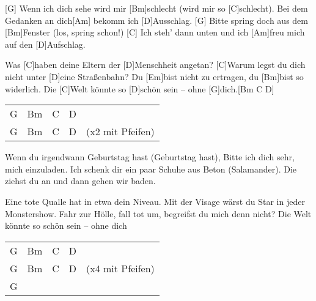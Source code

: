 

\begin{guitar}
	[G] Wenn ich dich sehe wird mir [Bm]schlecht (wird mir so [C]schlecht).
	Bei dem Gedanken an dich[Am] bekomm ich [D]Ausschlag.
	[G] Bitte spring doch aus dem [Bm]Fenster (los, spring schon!)
	[C] Ich steh' dann unten und ich [Am]freu mich auf den [D]Aufschlag.
	
	Was [C]haben deine Eltern der [D]Menschheit angetan?
	[C]Warum legst du dich nicht unter [D]eine Straßenbahn?
	Du [Em]bist nicht zu ertragen, du [Bm]bist so widerlich.
	Die [C]Welt könnte so [D]schön sein – ohne [G]dich.[Bm C D]{}
	
	{\footnotesize\begin{tabular}{l|l|l|l l}
			G & Bm & C & D & \\
			G & Bm & C & D & (x2 mit Pfeifen)
	\end{tabular}}

	Wenn du irgendwann Geburtstag hast (Geburtstag hast),
	Bitte ich dich sehr, mich einzuladen.
	Ich schenk dir ein paar Schuhe aus Beton (Salamander).
	Die ziehst du an und dann gehen wir baden.
	
	Eine tote Qualle hat in etwa dein Niveau.
	Mit der Visage wärst du Star in jeder Monstershow.
	Fahr zur Hölle, fall tot um, begreifst du mich denn nicht?
	Die Welt könnte so schön sein – ohne dich
	
	{\footnotesize\begin{tabular}{l|l|l|l l}
		G & Bm & C & D &  \\
		G & Bm & C & D & (x4 mit Pfeifen) \\
		G & & & &
	\end{tabular}}
\end{guitar}